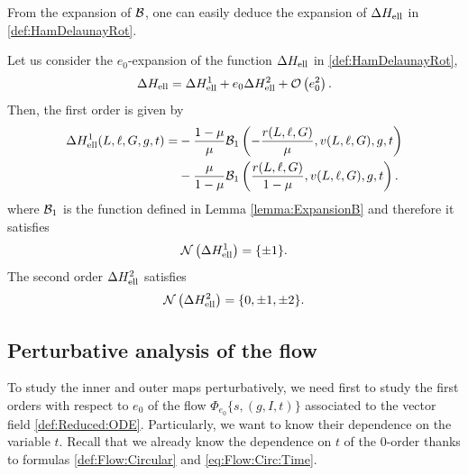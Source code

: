 From the expansion of $\mathcal{B}$, one can easily deduce the expansion of $\Delta H_{\mathrm{ell}}$ in \eqref{def:HamDelaunayRot}.
\begin{corollary}\label{coro:ExpansioHamiltonian}
  Let us consider the $e_0$-expansion of the function $\Delta H_{\mathrm{ell}}$ in \eqref{def:HamDelaunayRot},
  \[
  \Delta H_{\mathrm{ell}}=\Delta H^1_{\mathrm{ell}}+e_0\Delta H^2_{\mathrm{ell}}+\mathcal{O}\left(e_0^2\right).
  \]
  Then, the first order is given by
  \begin{equation}\label{def:Ham:Elliptic:order1}
    \begin{split}
      \Delta H^1_{\mathrm{ell}}(L,\ell,G,g,t) =& -\frac{1-\mu}{\mu}\mathcal{B}_1\left(-\frac{r(L,\ell,G)}{\mu},v(L,\ell,G),g,t\right)\\
      &-\frac{\mu}{1-\mu}\mathcal{B}_1\left(\frac{r(L,\ell,G)}{1-\mu},v(L,\ell,G),g,t\right).
    \end{split}
  \end{equation}
  where $\mathcal{B}_1$ is the function defined in Lemma \ref{lemma:ExpansionB} and therefore it satisfies
  \[
  \mathcal{N}\left(\Delta H^1_{\mathrm{ell}}\right)=\{\pm 1\}.
  \]
  The second order $\Delta H^2_{\mathrm{ell}}$ satisfies
  \[
  \mathcal{N}\left(\Delta H^2_{\mathrm{ell}}\right)=\{0,\pm 1,\pm 2\}.
  \]
\end{corollary}



\subsection{Perturbative analysis of the flow}\label{sec:FlowExpansion}
To study the inner and outer maps perturbatively, we need first to study the first orders with respect to $e_0$ of the flow $\Phi_{e_0}\{s,(g,I,t)\}$ associated to the vector field \eqref{def:Reduced:ODE}. Particularly, we want to know their dependence on the variable $t$. Recall that we already know the dependence on $t$ of  the $0$-order thanks to formulas \eqref{def:Flow:Circular} and \eqref{eq:Flow:Circ:Time}.

